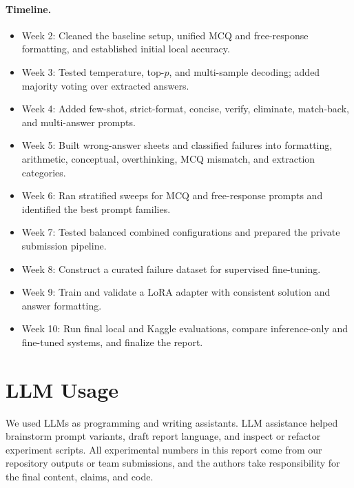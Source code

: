 \documentclass{article}
\begin{document}
\paragraph{Timeline.}
\begin{itemize}
  \item Week 2: Cleaned the baseline setup, unified MCQ and free-response formatting, and established initial local accuracy.
  \item Week 3: Tested temperature, top-$p$, and multi-sample decoding; added majority voting over extracted answers.
  \item Week 4: Added few-shot, strict-format, concise, verify, eliminate, match-back, and multi-answer prompts.
  \item Week 5: Built wrong-answer sheets and classified failures into formatting, arithmetic, conceptual, overthinking, MCQ mismatch, and extraction categories.
  \item Week 6: Ran stratified sweeps for MCQ and free-response prompts and identified the best prompt families.
  \item Week 7: Tested balanced combined configurations and prepared the private submission pipeline.
  \item Week 8: Construct a curated failure dataset for supervised fine-tuning.
  \item Week 9: Train and validate a LoRA adapter with consistent solution and answer formatting.
  \item Week 10: Run final local and Kaggle evaluations, compare inference-only and fine-tuned systems, and finalize the report.
\end{itemize}

\section*{LLM Usage}
We used LLMs as programming and writing assistants. LLM assistance helped brainstorm prompt variants, draft report language, and inspect or refactor experiment scripts. All experimental numbers in this report come from our repository outputs or team submissions, and the authors take responsibility for the final content, claims, and code.



\end{document}

